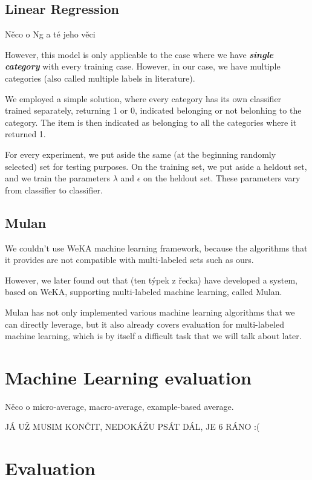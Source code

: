 \documentclass[letterpaper]{article}
\begin{document}
\subsection{Linear Regression}
Něco o Ng a té jeho věci


However, this model is only applicable to the case where we have \textbf{\emph{single category}} with every training case. However, in our case, we have multiple categories (also called multiple labels in literature). 

We employed a simple solution, where every category has its own classifier trained separately, returning 1 or 0, indicated belonging or not belonhing to the category. The item is then indicated as belonging to all the categories where it returned 1.

For every experiment, we put aside the same (at the beginning randomly selected) set for testing purposes. On the training set, we put aside a heldout set, and we train the parameters $\lambda$ and $\epsilon$ on the heldout set. These parameters vary from classifier to classifier.


\subsection{Mulan}
We couldn't use WeKA machine learning framework, because the algorithms that it provides are not compatible with multi-labeled sets such as ours.

However, we later found out  that (ten týpek z řecka) have developed a system, based on WeKA, supporting multi-labeled machine learning, called Mulan.

Mulan has not only implemented various machine learning algorithms that we can directly leverage, but it also already covers evaluation for multi-labeled machine learning, which is by itself a difficult task that we will talk about later.


\section{Machine Learning evaluation}
Něco o micro-average, macro-average, example-based average.

JÁ UŽ MUSIM KONČIT, NEDOKÁŽU PSÁT DÁL, JE 6 RÁNO :(


\section{Evaluation}
\end{document}
